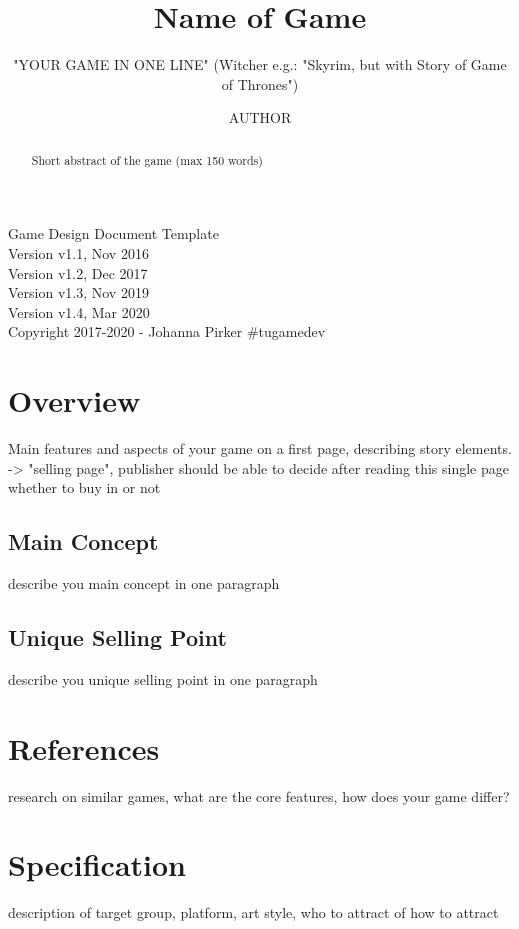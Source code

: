 \documentclass[a4paper]{scrreprt}
\title{Name of Game}
\subtitle{"YOUR GAME IN ONE LINE" (Witcher e.g.: "Skyrim, but with Story of Game of Thrones")}
\author{AUTHOR}
\begin{document}
\maketitle

\null\vfill
\noindent
Game Design Document Template\\ 
Version v1.1, Nov 2016\\
Version v1.2, Dec 2017\\
Version v1.3, Nov 2019\\
Version v1.4, Mar 2020\\
Copyright 2017-2020 - Johanna Pirker \#tugamedev\\
\newpage

\begin{abstract}
Short abstract of the game (max 150 words) 
\end{abstract}

\tableofcontents

\chapter{Overview}

Main features and aspects of your game on a first page, describing story elements. -> "selling page", publisher should be able to decide after reading this single page whether to buy in or not 

\section{Main Concept}
describe you main concept in one paragraph

\section{Unique Selling Point}
describe you unique selling point in one paragraph



\chapter{References} 
research on similar games, what are the core features, how does your game differ?


\chapter{Specification}
description of target group, platform, art style, who to attract of how to attract 
\end{document}
